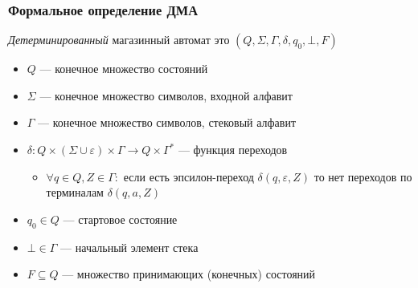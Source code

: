 \documentclass[dvipsnames]{beamer}
\newcommand{\state}[1]{{\color{red}{#1}}}
\newcommand{\stack}[1]{{\color{blue}{#1}}}
\newcommand{\symbl}[1]{{\color{PineGreen}{#1}}}
\newcommand{\conf}[3]{( \state{#1},\symbl{#2},\stack{#3} )}
\newenvironment{myauto}[1][3]
{
  \begin{center}
    \begin{tikzpicture}[> = stealth,node distance=#1cm, on grid, very thick]
}
{
    \end{tikzpicture}
  \end{center}
}
\begin{document}



\begin{frame}[fragile]
  \frametitle{Формальное определение ДМА}
  \emph{Детерминированный} магазинный автомат это $(Q, \Sigma, \Gamma, \delta, q_0, \bot, F)$
  \begin{itemize}
    \item $Q$ --- конечное множество состояний
    \item $\Sigma$ --- конечное множество символов, входной алфавит
    \item $\Gamma$ --- конечное множество символов, стековый алфавит
    \item $\delta: Q \times (\Sigma \cup \varepsilon) \times \Gamma \to Q \times \Gamma^*$ --- функция переходов
    \begin{itemize}
      \item $\forall q \in Q, Z \in \Gamma:$ если есть эпсилон-переход $\delta(q, \varepsilon, Z)$ то нет переходов по терминалам $\delta(q, a, Z)$
    \end{itemize}
    \item $q_0 \in Q$ --- стартовое состояние
    \item $\bot \in \Gamma$ --- начальный элемент стека
    \item $F \subseteq Q$ --- множество принимающих (конечных) состояний
  \end{itemize}
\end{frame}
\end{document}
